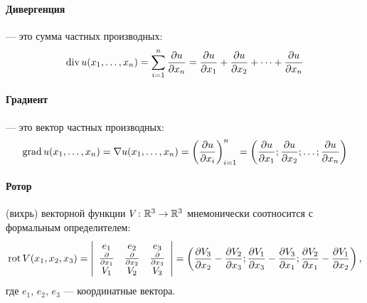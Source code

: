 \paragraph{Дивергенция}
--- это сумма частных производных:
$$
	\operatorname{div} u(x_1, \dots, x_n) =
	\sum_{i=1}^n \frac{\partial u}{\partial x_n} =
	\frac{\partial u}{\partial x_1} + \frac{\partial u}{\partial x_2} +
	\dots + \frac{\partial u}{\partial x_n}
$$

\paragraph{Градиент}
--- это вектор частных производных:
$$
	\operatorname{grad} u(x_1, \dots, x_n) =
	\nabla u(x_1, \dots, x_n) =
	\left( \frac{\partial u}{\partial x_i}\right)_{i=1}^{n} =
	\left( \frac{\partial u}{\partial x_1} ; \frac{\partial u}{\partial x_2} ;
	\dots; \frac{\partial u}{\partial x_n}\right)
$$

\paragraph{Ротор}
(вихрь) векторной функции
$V \colon \mathbb{R}^3 \to \mathbb{R}^3$
мнемонически соотносится с формальным определителем:
$$
	\operatorname{rot} V(x_1, x_2, x_3) =
	\left|
		\begin{array}{ccc}
			e_1                           & e_2                           & e_3 \\
			\frac{\partial}{\partial x_1} & \frac{\partial}{\partial x_2} & \frac{\partial}{\partial x_3} \\
			V_1                           & V_2                           & V_3
		\end{array}
	\right|
	=
	\left(
		\frac{\partial V_3}{\partial x_2} - \frac{\partial V_2}{\partial x_3} ;
		\frac{\partial V_1}{\partial x_3} - \frac{\partial V_3}{\partial x_1} ;
		\frac{\partial V_2}{\partial x_1} - \frac{\partial V_1}{\partial x_2}
	\right),
$$
где $e_1$, $e_2$, $e_3$ --- координатные вектора.
